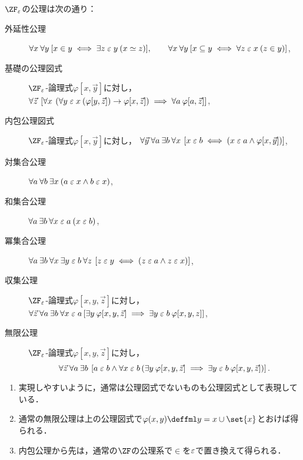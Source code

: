 \documentclass[realisability.tex]{subfiles}
\begin{document}
\begin{definition}[理論$\ZF_{\varepsilon}$]
 $\ZF_\varepsilon$の公理は次の通り：
 \begin{description}
  \item[外延性公理]
   $\forall x \: \forall y \: [x \in y \iff \exists z \mathrel{\varepsilon} y \: (x \simeq z)], \qquad
     \forall x \: \forall y \: [x \subseteq y \iff \forall z \mathrel{\varepsilon} x \: (z \in y)]$,
  \item[基礎の公理図式] $\ZF_{\varepsilon}$-論理式$\varphi[x, \vec{y}]$に対し，
     $\forall\vec{z} \:\left[\forall x \: \left( \forall y \mathrel{\varepsilon} x \: (\varphi[y, \vec{z}]) \to \varphi[x, \vec{z}] \right) \implies \forall a\: \varphi[a, \vec{z}]\right]$,
  \item[内包公理図式]
    $\ZF_{\varepsilon}$-論理式$\varphi[x, \vec{y}]$に対し，
    $\forall \vec{y}\: \forall a \: \exists b \: \forall x \: \left[x \mathrel{\varepsilon} b \iff (x \mathrel{\varepsilon} a \land \varphi[x, \vec{y}])\right]$,
  \item[対集合公理]
    $\forall a \: \forall b \: \exists x \: (a \mathrel{\varepsilon} x \land b \mathrel{\varepsilon} x)$,
  \item[和集合公理] 
    $\forall a \: \exists b \: \forall x \mathrel{\varepsilon} a \: (x \mathrel{\varepsilon} b)$,
  \item[冪集合公理] 
    $\forall a \: \exists b \: \forall x\: \exists y \mathrel{\varepsilon} b \: \forall z \: \left[z \mathrel{\varepsilon} y \iff (z \mathrel{\varepsilon} a \land z \mathrel{\varepsilon} x) \right]$,
  \item[収集公理]
    $\ZF_{\varepsilon}$-論理式$\varphi[x, y, \vec{z}]$に対し，
    $\forall \vec{z}\: \forall a \: \exists b \: \forall x \mathrel{\varepsilon} a \left[
             \exists y \: \varphi[x, y, \vec{z}] \implies \exists y \mathrel{\varepsilon} b \: \varphi[x, y, z]\right]$,
  \item[無限公理] 
    $\ZF_{\varepsilon}$-論理式$\varphi[x, y, \vec{z}]$に対し，
    \[
     \forall \vec{z} \: \forall a \: \exists b\:
             \left[ a \mathrel{\varepsilon} b \land
                    \forall x \mathrel{\varepsilon} b \left(\exists y \: \varphi[x,y,\vec{z}] \implies \exists y \mathrel{\varepsilon} b\: \varphi[x, y, \vec{z}] \right)
             \right].
    \]
 \end{description}
\end{definition}
\begin{remark}
 \begin{enumerate}
  \item 実現しやすいように，通常は公理図式でないものも公理図式として表現している．
  \item 通常の無限公理は上の公理図式で$\varphi(x, y) \deffml y = x \cup \set{x}$とおけば得られる．
  \item 内包公理から先は，通常の$\ZF$の公理系で${\in}$を${\mathrel{\varepsilon}}$で置き換えて得られる．
 \end{enumerate}
\end{remark}
\end{document}
